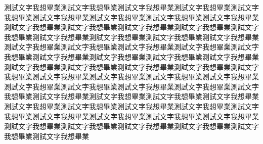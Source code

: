 \clearpage
\appendix
{}
\label{appendix}

測試文字我想畢業測試文字我想畢業測試文字我想畢業測試文字我想畢業測試文字我想畢業測試文字我想畢業測試文字我想畢業測試文字我想畢業測試文字我想畢業測試文字我想畢業測試文字我想畢業測試文字我想畢業測試文字我想畢業測試文字我想畢業測試文字我想畢業測試文字我想畢業測試文字我想畢業測試文字我想畢業測試文字我想畢業測試文字我想畢業測試文字我想畢業測試文字我想畢業測試文字我想畢業測試文字我想畢業測試文字我想畢業測試文字我想畢業測試文字我想畢業測試文字我想畢業測試文字我想畢業測試文字我想畢業測試文字我想畢業測試文字我想畢業測試文字我想畢業測試文字我想畢業測試文字我想畢業測試文字我想畢業測試文字我想畢業測試文字我想畢業測試文字我想畢業測試文字我想畢業測試文字我想畢業測試文字我想畢業測試文字我想畢業測試文字我想畢業測試文字我想畢業測試文字我想畢業測試文字我想畢業測試文字我想畢業測試文字我想畢業測試文字我想畢業測試文字我想畢業測試文字我想畢業測試文字我想畢業測試文字我想畢業測試文字我想畢業測試文字我想畢業測試文字我想畢業測試文字我想畢業測試文字我想畢業測試文字我想畢業